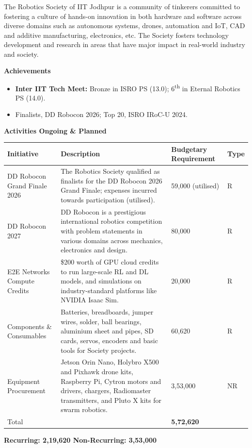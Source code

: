 \documentclass[11pt,letterpaper]{article}
\newcommand{\rs}{{\rupee}}
\newcommand{\subhead}[1]{\par{\bfseries #1}\par}
\begin{document}
The Robotics Society of IIT Jodhpur is a community of tinkerers committed to fostering a culture of hands-on innovation in both hardware and software across diverse domains such as autonomous systems, drones, automation and IoT, CAD and additive manufacturing, electronics, etc. The Society fosters technology development and research in areas that have major impact in real-world industry and society.

\subhead{Achievements}
\begin{itemize}
  \item \textbf{Inter IIT Tech Meet:} Bronze in ISRO PS (13.0); 6\textsuperscript{th} in Eternal Robotics PS (14.0).
  \item Finalists, DD Robocon 2026; Top 20, ISRO IRoC-U 2024.
\end{itemize}

\subhead{Activities Ongoing \& Planned}
\begin{longtable}{|L{0.25\textwidth}|L{0.40\textwidth}|C{0.17\textwidth}|C{0.06\textwidth}|}
\hline
\textbf{Initiative} & \textbf{Description} & \textbf{Budgetary Requirement} & \textbf{Type}\\ \hline
DD Robocon Grand Finale 2026 & The Robotics Society qualified as finalists for the DD Robocon 2026 Grand Finale; expenses incurred towards participation (utilised). & \rs59,000 (utilised) & R\\ \hline
DD Robocon 2027 & DD Robocon is a prestigious international robotics competition with problem statements in various domains across mechanics, electronics and design. & \rs80,000 & R\\ \hline
E2E Networks Compute Credits & \$200 worth of GPU cloud credits to run large-scale RL and DL models, and simulations on industry-standard platforms like NVIDIA Isaac Sim. & \rs20,000 & R\\ \hline
Components \& Consumables & Batteries, breadboards, jumper wires, solder, ball bearings, aluminium sheet and pipes, SD cards, servos, encoders and basic tools for Society projects. & \rs60,620 & R\\ \hline
Equipment Procurement & Jetson Orin Nano, Holybro X500 and Pixhawk drone kits, Raspberry Pi, Cytron motors and drivers, chargers, Radiomaster transmitters, and Pluto X kits for swarm robotics. & \rs3,53,000 & NR\\ \hline
Total & & \textbf{\large\rs5,72,620} & \\ \hline
\end{longtable}

\textbf{Recurring: \rs2,19,620 \quad Non-Recurring: \rs3,53,000}
\end{document}
